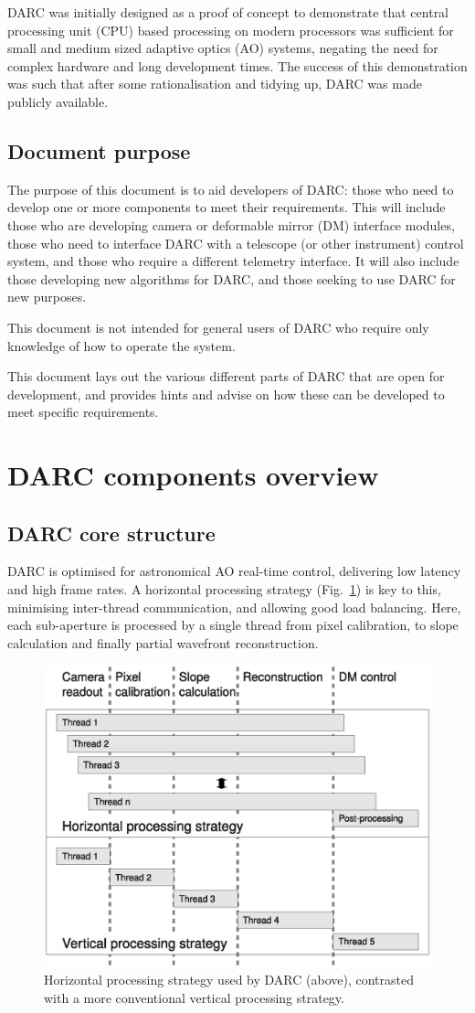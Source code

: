 \documentclass[a4,10pt]{article}
\newcommand{\ao}{adaptive optics (AO)\renewcommand{\ao}{AO\xspace}\xspace}
\newcommand{\cpu}{central processing unit
  (CPU)\renewcommand{\cpu}{CPU\xspace}\xspace}
\newcommand{\dm}{deformable mirror (DM)\renewcommand{\dm}{DM\xspace}\xspace}
\begin{document}
DARC was initially designed as a proof of concept to demonstrate that
\cpu based processing on modern processors was sufficient for small
and medium sized \ao systems, negating the need for complex hardware
and long development times.  The success of this demonstration was
such that after some rationalisation and tidying up, DARC was made
publicly available.

\subsection{Document purpose}
The purpose of this document is to aid developers of DARC:  those who
need to develop one or more components to meet their requirements.
This will include those who are developing camera or \dm interface
modules, those who need to interface DARC with a telescope (or other
instrument) control system, and those who require a different
telemetry interface.  It will also include those developing new
algorithms for DARC, and those seeking to use DARC for new purposes.

This document is not intended for general users of DARC who require
only knowledge of how to operate the system.

This document lays out the various different parts of DARC that are
open for development, and provides hints and advise on how these can
be developed to meet specific requirements.

\section{DARC components overview}
\subsection{DARC core structure}
DARC is optimised for astronomical \ao real-time control, delivering
low latency and high frame rates.  A horizontal processing strategy
(Fig.~\ref{fig:horiz}) is key to this, minimising inter-thread
communication, and allowing good load balancing.  Here, each
sub-aperture is processed by a single thread from pixel calibration,
to slope calculation and finally partial wavefront reconstruction.  

\begin{figure}
\includegraphics[width=0.5\linewidth]{processingStrategy.eps}
\caption{Horizontal processing strategy used by
  DARC (above), contrasted with a more conventional vertical
  processing strategy.}
\label{fig:horiz}
\end{figure}
\end{document}
